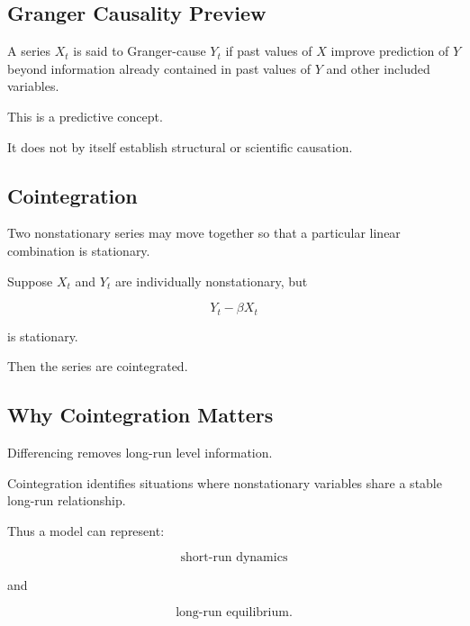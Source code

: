 \subsection{Granger Causality Preview}
\label{subsec:granger-causality-preview}

A series \(X_t\) is said to Granger-cause \(Y_t\) if past values of \(X\)
improve prediction of \(Y\) beyond information already contained in past
values of \(Y\) and other included variables.

This is a predictive concept.

It does not by itself establish structural or scientific causation.

\subsection{Cointegration}
\label{subsec:cointegration}

Two nonstationary series may move together so that a particular linear
combination is stationary.

Suppose \(X_t\) and \(Y_t\) are individually nonstationary, but

\[
\boxed{
Y_t-\beta X_t
}
\]

is stationary.

Then the series are cointegrated.

\subsection{Why Cointegration Matters}
\label{subsec:why-cointegration}

Differencing removes long-run level information.

Cointegration identifies situations where nonstationary variables share a
stable long-run relationship.

Thus a model can represent:

\[
\boxed{
\text{short-run dynamics}
}
\]

and

\[
\boxed{
\text{long-run equilibrium}.
}
\]

